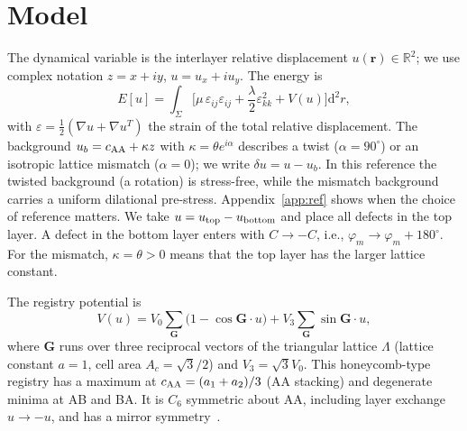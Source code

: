 \documentclass[prb,twocolumn,superscriptaddress,floatfix,10pt]{revtex4-2}
\newcommand{\dd}{\mathrm{d}}
\begin{document}
\section{Model}\label{sec:model}

The dynamical variable is the interlayer relative displacement $u(\bm r)\in\mathbb{R}^2$; we use complex notation $z=x+iy$, $u=u_x+iu_y$. The energy is
\begin{equation}
E[u]=\int_\Sigma\Big[\mu\,\varepsilon_{ij}\varepsilon_{ij}+\frac{\lambda}{2}\varepsilon_{kk}^2+V(u)\Big]\dd^2r,
\label{eq:E}
\end{equation}
with $\varepsilon=\tfrac12(\nabla u+\nabla u^{T})$ the strain of the total relative displacement. The background $u_b=c_{\rm AA}+\kappa z$ with $\kappa=\theta e^{i\alpha}$ describes a twist ($\alpha=90^\circ$) or an isotropic lattice mismatch ($\alpha=0$); we write $\delta u=u-u_b$. In this reference the twisted background (a rotation) is stress-free, while the mismatch background carries a uniform dilational pre-stress. Appendix~\ref{app:ref} shows when the choice of reference matters. We take $u=u_{\rm top}-u_{\rm bottom}$ and place all defects in the top layer. A defect in the bottom layer enters with $C\to-C$, i.e., $\varphi_m\to\varphi_m+180^\circ$. For the mismatch, $\kappa=\theta>0$ means that the top layer has the larger lattice constant.

The registry potential is
\begin{equation}
V(u)=V_0\sum_{\bm G}\big(1-\cos\bm G\cdot u\big)+V_3\sum_{\bm G}\sin\bm G\cdot u ,
\end{equation}
where $\bm G$ runs over three reciprocal vectors of the triangular lattice $\Lambda$ (lattice constant $a=1$, cell area $A_c=\sqrt3/2$) and $V_3=\sqrt3V_0$. This honeycomb-type registry has a maximum at $c_{\rm AA}=(a_1+a_2)/3$ (AA stacking) and degenerate minima at AB and BA. It is $C_6$ symmetric about AA, including layer exchange $u\to-u$, and has a mirror symmetry~\cite{Popov2011,Nam2017}.
\end{document}
